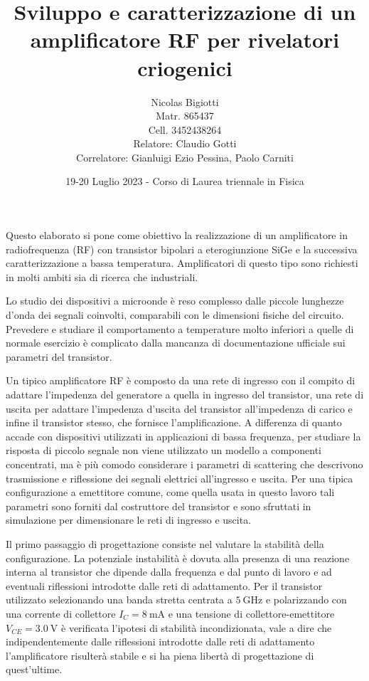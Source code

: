 \documentclass[12pt]{article}
\title{Sviluppo e caratterizzazione di un amplificatore RF per rivelatori criogenici}
\author{Nicolas Bigiotti\\{\small Matr. 865437}\\{\small Cell. 3452438264 }\\[0.4cm]{\small Relatore: Claudio Gotti}\\{\small Correlatore: Gianluigi Ezio Pessina, Paolo Carniti}}
\date{19-20 Luglio 2023 - Corso di Laurea triennale in Fisica}
\begin{document}
\maketitle

Questo elaborato si pone come obiettivo la realizzazione di un amplificatore in radiofrequenza (RF) con transistor bipolari a eterogiunzione SiGe e la successiva caratterizzazione a bassa temperatura. Amplificatori di questo tipo sono richiesti in molti ambiti sia di ricerca che industriali.

Lo studio dei dispositivi a microonde è reso complesso dalle piccole lunghezze d'onda dei segnali coinvolti, comparabili con le dimensioni fisiche del circuito. Prevedere e studiare il comportamento a temperature molto inferiori a quelle di normale esercizio è complicato dalla mancanza di documentazione ufficiale sui parametri del transistor.

Un tipico amplificatore RF è composto da una rete di ingresso con il compito di adattare l'impedenza del generatore a quella in ingresso del transistor, una rete di uscita per adattare l'impedenza d'uscita del transistor all'impedenza di carico e infine il transistor stesso, che fornisce l'amplificazione. A differenza di quanto accade con dispositivi utilizzati in applicazioni di bassa frequenza, per studiare la risposta di piccolo segnale non viene utilizzato un modello a componenti concentrati, ma è più comodo considerare i parametri di scattering che descrivono trasmissione e riflessione dei segnali elettrici all'ingresso e uscita. Per una tipica configurazione a emettitore comune, come quella usata in questo lavoro tali parametri sono forniti dal costruttore del transistor e sono sfruttati in simulazione per dimensionare le reti di ingresso e uscita.

Il primo passaggio di progettazione consiste nel valutare la stabilità della configurazione. La potenziale instabilità è dovuta alla presenza di una reazione interna al transistor che dipende dalla frequenza e dal punto di lavoro e ad eventuali riflessioni introdotte dalle reti di adattamento. Per il transistor utilizzato selezionando una banda stretta centrata a $\SI{5}{\giga\hertz}$ e polarizzando con una corrente di collettore $I_{C}=\SI{8}{\milli\ampere}$ e una tensione di collettore-emettitore $V_{CE}=\SI{3.0}{\volt}$ è verificata l'ipotesi di stabilità incondizionata, vale a dire che indipendentemente dalle riflessioni introdotte dalle reti di adattamento l'amplificatore risulterà stabile e si ha piena libertà di progettazione di quest'ultime.
\end{document}

